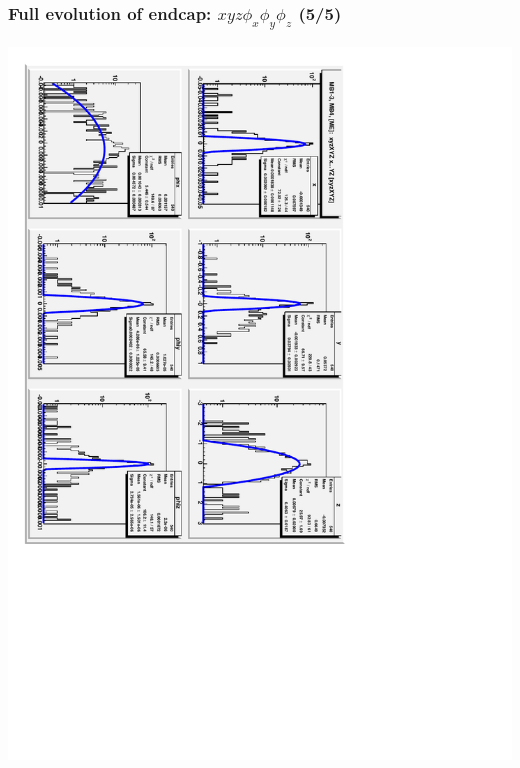 \documentclass[compress]{beamer}
\begin{document}
\begin{frame}
\frametitle{Full evolution of endcap: $xyz\phi_x\phi_y\phi_z$ (5/5)}
\begin{center}
\includegraphics[height=\linewidth, angle=90]{xyzXYZ_xYZ_xyzXYZ_endcap.pdf}
\end{center}
\end{frame}
\end{document}
